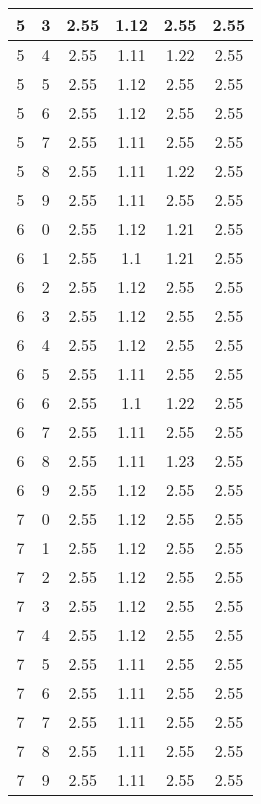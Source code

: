 \begin{longtable}{|c|c||c||c|c||c|}
	5 & 3 & 2.55 & 1.12 & 2.55 & 2.55 \\ \hline
	5 & 4 & 2.55 & 1.11 & 1.22 & 2.55 \\ \hline
	5 & 5 & 2.55 & 1.12 & 2.55 & 2.55 \\ \hline
	5 & 6 & 2.55 & 1.12 & 2.55 & 2.55 \\ \hline
	5 & 7 & 2.55 & 1.11 & 2.55 & 2.55 \\ \hline
	5 & 8 & 2.55 & 1.11 & 1.22 & 2.55 \\ \hline
	5 & 9 & 2.55 & 1.11 & 2.55 & 2.55 \\ \hline
	6 & 0 & 2.55 & 1.12 & 1.21 & 2.55 \\ \hline
	6 & 1 & 2.55 & 1.1 & 1.21 & 2.55 \\ \hline
	6 & 2 & 2.55 & 1.12 & 2.55 & 2.55 \\ \hline
	6 & 3 & 2.55 & 1.12 & 2.55 & 2.55 \\ \hline
	6 & 4 & 2.55 & 1.12 & 2.55 & 2.55 \\ \hline
	6 & 5 & 2.55 & 1.11 & 2.55 & 2.55 \\ \hline
	6 & 6 & 2.55 & 1.1 & 1.22 & 2.55 \\ \hline
	6 & 7 & 2.55 & 1.11 & 2.55 & 2.55 \\ \hline
	6 & 8 & 2.55 & 1.11 & 1.23 & 2.55 \\ \hline
	6 & 9 & 2.55 & 1.12 & 2.55 & 2.55 \\ \hline
	7 & 0 & 2.55 & 1.12 & 2.55 & 2.55 \\ \hline
	7 & 1 & 2.55 & 1.12 & 2.55 & 2.55 \\ \hline
	7 & 2 & 2.55 & 1.12 & 2.55 & 2.55 \\ \hline
	7 & 3 & 2.55 & 1.12 & 2.55 & 2.55 \\ \hline
	7 & 4 & 2.55 & 1.12 & 2.55 & 2.55 \\ \hline
	7 & 5 & 2.55 & 1.11 & 2.55 & 2.55 \\ \hline
	7 & 6 & 2.55 & 1.11 & 2.55 & 2.55 \\ \hline
	7 & 7 & 2.55 & 1.11 & 2.55 & 2.55 \\ \hline
	7 & 8 & 2.55 & 1.11 & 2.55 & 2.55 \\ \hline
	7 & 9 & 2.55 & 1.11 & 2.55 & 2.55 \\ \hline
\end{longtable}
\clearpage{}
